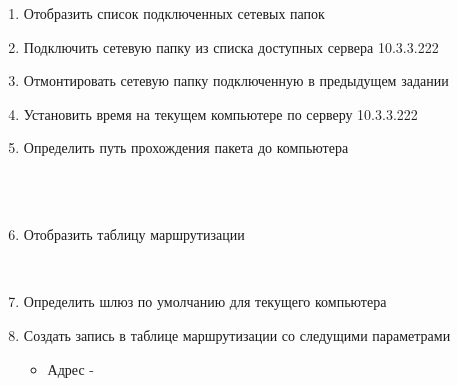 \documentclass[a4paper,12pt]{article}
\begin{document}
\begin{flushleft}
\begin{enumerate} [1. ]
\begin{enumerate} [\bf a. ]
\begin{flushleft}
         \\
        \end{flushleft}
        \item Отобразить список подключенных сетевых папок
        \begin{flushleft}
        \end{flushleft}
        \item Подключить сетевую папку из списка доступных сервера 10.3.3.222
        \begin{flushleft}
        \end{flushleft}
        \item Отмонтировать сетевую папку подключенную в предыдущем задании
        \begin{flushleft}
        \end{flushleft}
        \item Установить время на текущем компьютере по серверу 10.3.3.222
        \begin{flushleft}
        \end{flushleft}
        \item Определить путь прохождения пакета до компьютера 
        \begin{flushleft}
         \\
         \\
        \end{flushleft}
        \item Отобразить таблицу маршрутизации
        \begin{flushleft}
         \\
        \end{flushleft}
        \item Определить шлюз по умолчанию для текущего компьютера
        \begin{flushleft}
        \end{flushleft}
        \item Создать запись в таблице маршрутизации со следущими параметрами
          \begin{itemize}
           \item Адрес - 

\end{itemize}
\end{enumerate}
\end{enumerate}
\end{flushleft}
\end{document}
